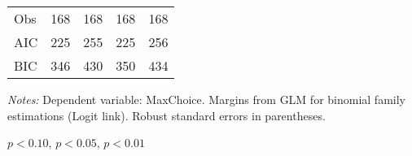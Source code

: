 \begin{table}[htbp]
\begin{threeparttable}
\begin{tabular}{l*{4}{D{.}{.}{-1}}}
Obs                 &                 168   &                 168   &                 168   &                 168   \\
AIC                 &                 225   &                 255   &                 225   &                 256   \\
BIC                 &                 346   &                 430   &                 350   &                 434   \\
\bottomrule
\end{tabular}
\begin{tablenotes}
\footnotesize
\item \textit{Notes:} Dependent variable: MaxChoice. Margins from GLM for binomial family estimations (Logit link). Robust standard errors in parentheses.
\item \sym{*} \(p<0.10\), \sym{**} \(p<0.05\), \sym{***} \(p<0.01\)
\end{tablenotes}
\end{threeparttable}
\label{tab:maxchoice_math}
\end{table}

